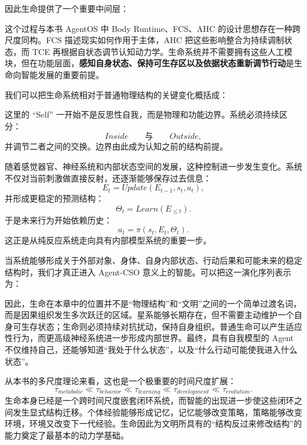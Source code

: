 因此生命提供了一个重要中间层：
\begin{statementbox}
\centering
{}
\end{statementbox}
这个过程与本书 AgentOS 中 Body Runtime、FCS、AHC 的设计思想存在一种跨尺度同构。FCS 描述现实如何作用于主体，AHC 把这些影响整合为持续调制状态，而 TCE 再根据自状态调节认知动力学。生命系统并不需要拥有这些人工模块，但在功能层面，\textbf{感知自身状态、保持可生存区以及依据状态重新调节行动}是生命向智能发展的重要前提。

我们可以把生命系统相对于普通物理结构的关键变化概括成：
\begin{statementbox}
\centering
{}
\end{statementbox}
这里的 ``Self'' 一开始不是反思性自我，而是物理和功能边界。系统必须持续区分：
\[
Inside
\qquad\text{与}\qquad
Outside,
\]
并调节二者之间的交换。边界由此成为认知之前的结构前提。

随着感觉器官、神经系统和内部状态空间的发展，这种控制进一步发生变化。系统不仅对当前刺激做直接反射，还逐渐能够保存过去信息：
\[
E_t
=
Update(E_{t-1},s_t,a_t),
\]
并形成更稳定的预测结构：
\[
\Theta_t
=
Learn(E_{\leq t}).
\]
于是未来行为开始依赖历史：
\[
a_t
=
\pi(s_t,E_t,\Theta_t).
\]
这正是从纯反应系统走向具有内部模型系统的重要一步。

当系统能够形成关于外部对象、身体、自身内部状态、行动后果和可能未来的稳定结构时，我们才真正进入 Agent-CSO 意义上的智能。可以把这一演化序列表示为：
\begin{statementbox}
\centering
{}
\end{statementbox}

因此，生命在本章中的位置并不是“物理结构”和“文明”之间的一个简单过渡名词，而是因果组织发生多次跃迁的区域。星系能够长期存在，但不需要主动维护一个自身可生存状态；生命则必须持续对抗扰动，保持自身组织。普通生命可以产生适应性行为，而更高级神经系统进一步形成内部世界。最终，具有自我模型的 Agent 不仅维持自己，还能够知道“我处于什么状态”，以及“什么行动可能使我进入什么状态”。

从本书的多尺度理论来看，这也是一个极重要的时间尺度扩展：
\[
\tau_{metabolic}
\ll
\tau_{behavior}
\ll
\tau_{learning}
\ll
\tau_{development}
\ll
\tau_{evolution}.
\]
生命本身已经是一个跨时间尺度嵌套闭环系统，而智能的出现进一步使这些闭环之间发生显式结构迁移。个体经验能够形成记忆，记忆能够改变策略，策略能够改变环境，环境又改变下一代经验。生命因此为文明所具有的“结构反过来修改结构”的能力奠定了最基本的动力学基础。

